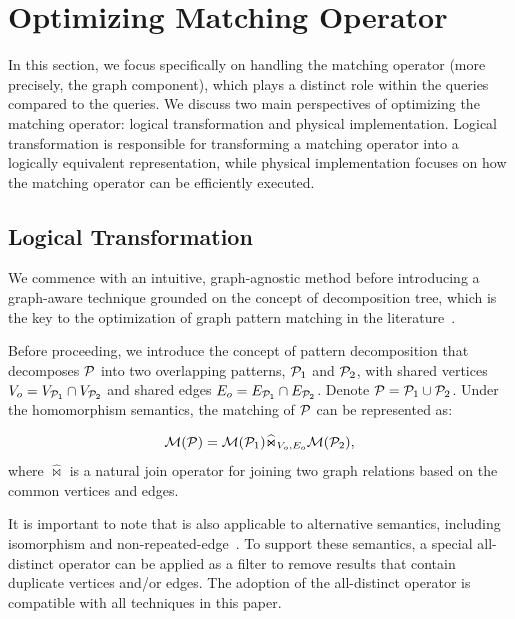 
\section{Optimizing Matching Operator}
In this section, we focus specifically on handling the matching operator (more precisely, the graph component),
which plays a distinct role within the \spjm queries compared to the \spj queries. We discuss two main perspectives of optimizing
the matching operator: logical transformation and physical implementation. Logical transformation is
responsible for transforming a matching operator into a logically equivalent representation,
while physical implementation focuses on how the matching operator can be efficiently executed.

\subsection{Logical Transformation}
\label{sec:handling-match-operator}
We commence with an intuitive, graph-agnostic method before
introducing a graph-aware technique grounded on the concept of decomposition tree, which
is the key to the optimization of graph pattern matching in the literature~\cite{huge,GLogS}.

Before proceeding, we introduce the concept of pattern decomposition that decomposes $\mathcal{P}$ into two overlapping patterns, $\mathcal{P}_1$ and $\mathcal{P}_2$, with shared vertices $V_{o} = V_{\mathcal{P}_1} \cap V_{\mathcal{P}_2}$ and shared edges $E_{o} = E_{\mathcal{P}_1} \cap E_{\mathcal{P}_2}$.
Denote $\mathcal{P} = \mathcal{P}_1 \cup \mathcal{P}_2$. Under the homomorphism semantics, the matching of $\mathcal{P}$ can be represented as:

\begin{equation}
    \label{eq:join-pattern}
    \mathcal{M}(\mathcal{P}) = \mathcal{M}(\mathcal{P}_1) \widehat{\Join}_{V_{o}, E_{o}} \mathcal{M}(\mathcal{P}_2),
\end{equation}
where $\widehat{\Join}$ is a natural join operator for joining two graph relations based on the common vertices and edges.

It is important to note that  is also applicable to alternative semantics, including isomorphism and non-repeated-edge~\cite{angles2017foundations}. To support these semantics, a special all-distinct operator can be applied as a filter to remove results that contain duplicate vertices and/or edges. The adoption of the all-distinct operator is compatible with all techniques in this paper.

